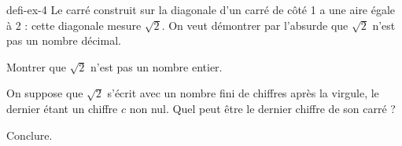 \begin{blocEdition}{defi-ex-4}
Le carré construit sur la diagonale d’un carré de côté 1 a une aire égale à 2 : cette diagonale mesure $\sqrt2$. On veut démontrer par l’absurde que $\sqrt2$ n’est pas un nombre décimal.\begin{questions}\item Montrer que $\sqrt2$ n’est pas un nombre entier.\item On suppose que $\sqrt2$ s’écrit avec un nombre fini de chiffres après la virgule, le dernier étant un chiffre $c$ non nul. Quel peut être le dernier chiffre de son carré ?\item Conclure.\end{questions}\label{fig-defi-4}
\par{}\par\par{}\par{}\par{}\par{}\par{}\par{}
\end{blocEdition}
